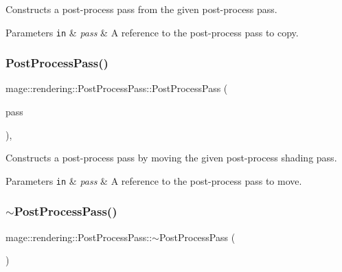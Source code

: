 Constructs a post-\/process pass from the given post-\/process pass.


\begin{DoxyParams}[1]{Parameters}
\mbox{\tt in}  & {\em pass} & A reference to the post-\/process pass to copy. \\
\hline
\end{DoxyParams}
\hypertarget{classmage_1_1rendering_1_1_post_process_pass_aa57a8a38643fc76d0cdae8106c3de7e3}{}\label{classmage_1_1rendering_1_1_post_process_pass_aa57a8a38643fc76d0cdae8106c3de7e3} 
\subsubsection{\texorpdfstring{Post\+Process\+Pass()}{PostProcessPass()}\hspace{0.1cm}{\footnotesize\ttfamily [3/3]}}
{\footnotesize\ttfamily mage\+::rendering\+::\+Post\+Process\+Pass\+::\+Post\+Process\+Pass (\begin{DoxyParamCaption}\item[{\hyperlink{classmage_1_1rendering_1_1_post_process_pass}{Post\+Process\+Pass} \&\&}]{pass }\end{DoxyParamCaption})\hspace{0.3cm}{\ttfamily [default]}, {\ttfamily [noexcept]}}

Constructs a post-\/process pass by moving the given post-\/process shading pass.


\begin{DoxyParams}[1]{Parameters}
\mbox{\tt in}  & {\em pass} & A reference to the post-\/process pass to move. \\
\hline
\end{DoxyParams}
\hypertarget{classmage_1_1rendering_1_1_post_process_pass_a41e82fe23fdc3a5726989edb0bb334ea}{}\label{classmage_1_1rendering_1_1_post_process_pass_a41e82fe23fdc3a5726989edb0bb334ea} 
\subsubsection{\texorpdfstring{$\sim$\+Post\+Process\+Pass()}{~PostProcessPass()}}
{\footnotesize\ttfamily mage\+::rendering\+::\+Post\+Process\+Pass\+::$\sim$\+Post\+Process\+Pass (\begin{DoxyParamCaption}{ }\end{DoxyParamCaption})\hspace{0.3cm}{\ttfamily [default]}}

